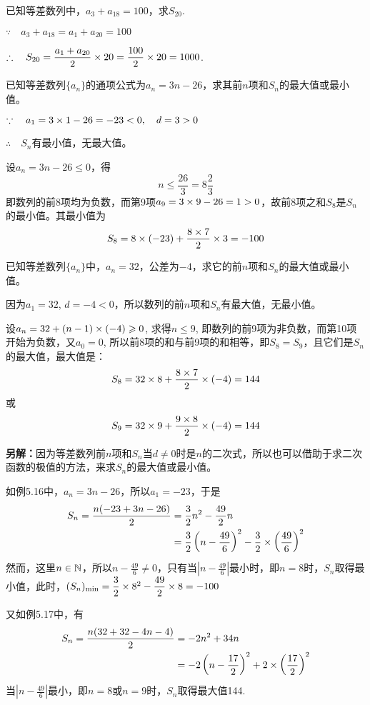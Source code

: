 \begin{example}
    已知等差数列中，$a_3+a_{18}=100$，求$S_{20}$.
\end{example}

\begin{solution}
$\because\quad a_3+a_{18}=a_1+a_{20}=100$

$\therefore\quad S_{20}=\dfrac{a_1+a_{20}}{2}\times20=\dfrac{100}{2}\times 20=1000$.
\end{solution}


\begin{example}
    已知等差数列$\{a_n\}$的通项公式为$a_n=3n-26$，求其前$n$项和$S_n$的最大值或最小值。
\end{example}

\begin{solution}
 $\because\quad    a_1=3\times 1-26=-23<0,\quad d=3>0$

 $\therefore\quad S_n$有最小值，无最大值。

 设$a_n=3n-26\le 0$，得
\[n\le \frac{26}{3}=8\frac{2}{3}\]
即数列的前8项均为负数，而第9项$a_9=3\times9-26=1>0$，故前8项之和$S_8$是$S_n$的最小值。其最小值为
\[S_8=8\times(-23)+\dfrac{8\times7}{2}\times3=-100\]
\end{solution}

\begin{example}
    已知等差数列$\{a_n\}$中，$a_n=32$，公差为$-4$，求它的前$n$项和$S_n$的最大值或最小值。
\end{example}

\begin{solution}
    因为$a_1=32$, $d=-4<0$，所以数列的前$n$项和$S_n$有最大值，无最小值。

    设$a_n=32+(n-1)\times(-4)\geqslant 0$, 求得$n\le 9$, 
即数列的前9项为非负数，而第10项开始为负数，又$a_0=0$, 所以前8项的和与前9项的和相等，即$S_8=S_9$，且它们是$S_n$的最大值，最大值是：
\[S_8=32\times8+\dfrac{8\times7}{2}\times(-4)=144\]
或
\[S_9=32\times9+\dfrac{9\times8}{2}\times(-4)=144\]

\textbf{另解：}因为等差数列前$n$项和$S_n$当$d\ne 0$时是$n$的二次式，所以也可以借助于求二次函数的极值的方法，来求$S_n$的最大值或最小值。

如例5.16中，$a_n=3n-26$，所以$a_1=-23$，于是
\[\begin{split}
    S_n=\dfrac{n(-23+3n-26)}{2}&=\dfrac{3}{2}n^2-\dfrac{49}{2}n\\
    &=\dfrac{3}{2}\left(n-\dfrac{49}{6}\right)^2-\dfrac{3}{2}\times \left(\dfrac{49}{6}\right)^2
\end{split}\]
然而，这里$n\in\mathbb{N}$，所以$n-\frac{49}{6}\ne 0$，只有当$\left|n-\frac{49}{6}\right|$最小时，即$n=8$时，$S_n$取得最小值，此时，$(S_n)_{\min}=\dfrac{3}{2}\times 8^2-\dfrac{49}{2}\times 8=-100$

又如例5.17中，有
\[\begin{split}
    S_n=\dfrac{n(32+32-4n-4)}{2}&=-2n^2+34n\\
    &=-2\left(n-\dfrac{17}{2}\right)^2+2\times \left(\dfrac{17}{2}\right)^2
\end{split}\]
当$\left|n-\frac{49}{6}\right|$最小，即$n=8$或$n=9$时，$S_n$取得最大值144.
\end{solution}

